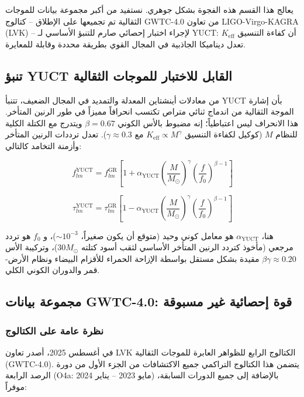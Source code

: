 \documentclass[11pt,a4paper]{article}
\theoremstyle{remark}
\newcommand{\Keff}{K_{\mathrm{eff}}}
\begin{document}
	يعالج هذا القسم هذه الفجوة بشكل جوهري. نستفيد من أكبر مجموعة بيانات للموجات الثقالية تم تجميعها على الإطلاق – كتالوج GWTC-4.0 من تعاون LIGO-Virgo-KAGRA (LVK) – لإجراء اختبار إحصائي صارم للتنبؤ الأساسي لـ YUCT: أن كفاءة التنسيق $\Keff$ تعدل ديناميكا الجاذبية في المجال القوي بطريقة محددة وقابلة للمعايرة.
	
	\subsection{تنبؤ YUCT القابل للاختبار للموجات الثقالية}
	
	من معادلات أينشتاين المعدلة والتمديد في المجال الضعيف، تتنبأ YUCT بأن إشارة الموجة الثقالية من اندماج ثنائي متراص تكتسب انحرافاً مميزاً في طور الرنين المتأخر. هذا الانحراف ليس اعتباطياً؛ إنه مضبوط بالأس الكوني $\beta = 0.67$ ويتدرج مع الكتلة الكلية للنظام $M$ (كوكيل لكفاءة التنسيق $\Keff \propto M^{\gamma}$ مع $\gamma \approx 0.3$). تعدل ترددات الرنين المتأخر وأزمنة التخامد كالتالي:
	
	\begin{equation}
		f_{lm}^{\text{YUCT}} = f_{lm}^{\text{GR}} \left[ 1 + \alpha_{\text{YUCT}} \left( \frac{M}{M_\odot} \right)^{\gamma} \left( \frac{f}{f_0} \right)^{\beta-1} \right]
		\label{eq:freq-mod}
	\end{equation}
	
	\begin{equation}
		\tau_{lm}^{\text{YUCT}} = \tau_{lm}^{\text{GR}} \left[ 1 - \alpha_{\text{YUCT}} \left( \frac{M}{M_\odot} \right)^{\gamma} \left( \frac{f}{f_0} \right)^{\beta-1} \right]
		\label{eq:tau-mod}
	\end{equation}
	
	هنا، $\alpha_{\text{YUCT}}$ هو معامل كوني وحيد (متوقع أن يكون صغيراً، $\sim 10^{-3}$)، و $f_0$ هو تردد مرجعي (مأخوذ كتردد الرنين المتأخر الأساسي لثقب أسود كتلته $30 M_\odot$)، وتركيبة الأس $\beta\gamma \approx 0.20$ مقيدة بشكل مستقل بواسطة الإزاحة الحمراء للأقزام البيضاء ونظام الأرض-قمر والدوران الكوني الكلي.
	
	\subsection{مجموعة بيانات GWTC-4.0: قوة إحصائية غير مسبوقة}
	
	\subsubsection{نظرة عامة على الكتالوج}
	
	في أغسطس 2025، أصدر تعاون LVK الكتالوج الرابع للظواهر العابرة للموجات الثقالية (GWTC-4.0). يتضمن هذا الكتالوج التراكمي جميع الاكتشافات من الجزء الأول من دورة الرصد الرابعة (O4a: مايو 2023 – يناير 2024) بالإضافة إلى جميع الدورات السابقة، موفراً:
	
\end{document}
